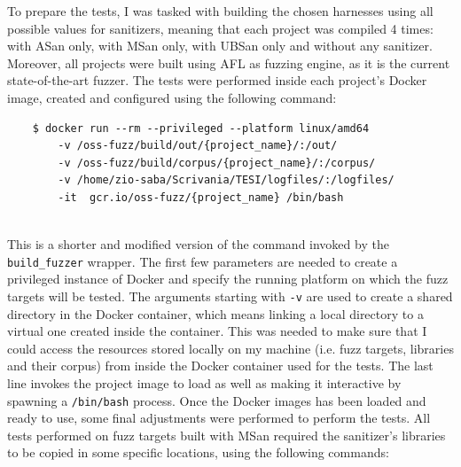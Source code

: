 \newpage
To prepare the tests, I was tasked with building the chosen harnesses using all possible values for sanitizers, meaning that each project was compiled 4 times: with ASan only, with MSan only, with UBSan only and without any sanitizer.
\newline
Moreover, all projects were built using AFL as fuzzing engine, as it is the current state-of-the-art fuzzer. 
\newline \newline
The tests were performed inside each project's Docker image, created and configured using the following command:
\begin{verbatim}
    $ docker run --rm --privileged --platform linux/amd64 
        -v /oss-fuzz/build/out/{project_name}/:/out/
        -v /oss-fuzz/build/corpus/{project_name}/:/corpus/    
        -v /home/zio-saba/Scrivania/TESI/logfiles/:/logfiles/ 
        -it  gcr.io/oss-fuzz/{project_name} /bin/bash
\end{verbatim}
\ \\
This is a shorter and modified version of the command invoked by the \verb|build_fuzzer| wrapper.
\newline \newline
The first few parameters are needed to create a privileged instance of Docker and specify the running platform on which the fuzz targets will be tested.
\newline \newline
The arguments starting with \verb|-v| are used to create a shared directory in the Docker container, which means linking a local directory to a virtual one created inside the container. This was needed to make sure that I could access the resources stored locally on my machine (i.e. fuzz targets, libraries and their corpus) from inside the Docker container used for the tests.
\newline \newline
The last line invokes the project image to load as well as making it interactive by spawning a \verb|/bin/bash| process.
\newline \newline \newline \newline
Once the Docker images has been loaded and ready to use, some final adjustments were performed to perform the tests.
\newline \newline
All tests performed on fuzz targets built with MSan required the sanitizer's libraries to be copied in some specific locations, using the following commands:
